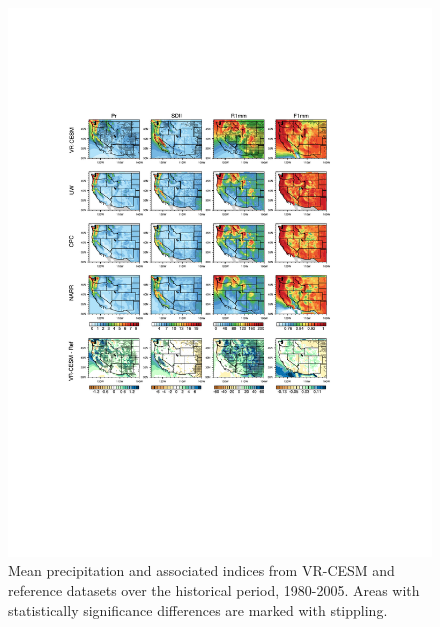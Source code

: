 \documentclass{ametsoc}
\begin{document}
\begin{figure}
\begin{center}
\includegraphics[width=6in, trim={3cm 6.5cm 5.2cm 4.9cm},clip]{wd_index_Hist_ref_annual_part1.pdf}
\caption{Mean precipitation and associated indices from VR-CESM and reference datasets over the historical period, 1980-2005.  Areas with statistically significance differences are marked with stippling.}
\label{fig:histEval1}
\end{center}
\end{figure}
\end{document}
